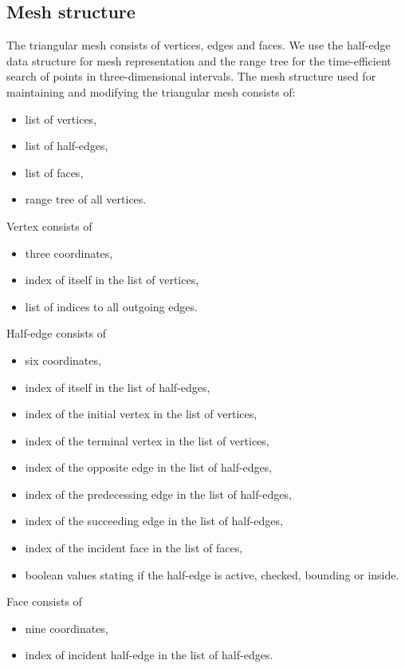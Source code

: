 \subsection{Mesh structure}
The triangular mesh consists of vertices, edges and faces. We use the half-edge 
data structure for mesh representation and the range tree for the time-efficient search of points in three-dimensional intervals.
The mesh structure used for maintaining and modifying the triangular mesh
consists of:
\begin{itemize}
    \setlength\itemsep{-2mm}
    \item list of vertices,
    \item list of half-edges,
    \item list of faces,
    \item range tree of all vertices.
\end{itemize}
Vertex consists of 
\begin{itemize}
    \setlength\itemsep{-2mm}
    \item three coordinates,
    \item index of itself in the list of vertices,
    \item list of indices to all outgoing edges.
\end{itemize}
Half-edge consists of 
\begin{itemize}
    \setlength\itemsep{-2mm}
    \item six coordinates,
    \item index of itself in the list of half-edges,
    \item index of the initial vertex in the list of vertices, 
    \item index of the terminal vertex in the list of vertices,
    \item index of the opposite edge in the list of half-edges,
    \item index of the predecessing edge in the list of half-edges,
    \item index of the succeeding edge in the list of half-edges,
    \item index of the incident face in the list of faces,
    \item boolean values stating if the half-edge is active, checked, 
    bounding or inside.
\end{itemize}
Face consists of
\begin{itemize}
    \setlength\itemsep{-2mm}
    \item nine coordinates,
    \item index of incident half-edge in the list of half-edges.
\end{itemize}

